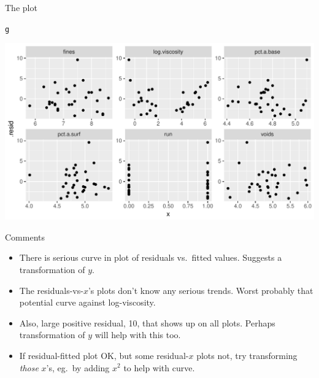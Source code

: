 \documentclass[unknownkeysallowed]{beamer}\usepackage[]{graphicx}\usepackage[]{color}
\makeatletter
\def\maxwidth{ %
  \ifdim\Gin@nat@width>\linewidth
    \linewidth
  \else
    \Gin@nat@width
  \fi
}
\newcommand{\hlstd}[1]{\textcolor[rgb]{0.345,0.345,0.345}{#1}}%
\newenvironment{kframe}{%
 \def\at@end@of@kframe{}%
 \ifinner\ifhmode%
  \def\at@end@of@kframe{\end{minipage}}%
  \begin{minipage}{\columnwidth}%
 \fi\fi%
 \def\FrameCommand##1{\hskip\@totalleftmargin \hskip-\fboxsep
 \colorbox{shadecolor}{##1}\hskip-\fboxsep
     \hskip-\linewidth \hskip-\@totalleftmargin \hskip\columnwidth}%
 \MakeFramed {\advance\hsize-\width
   \@totalleftmargin\z@ \linewidth\hsize
   \@setminipage}}%
 {\par\unskip\endMakeFramed%
 \at@end@of@kframe}
\newenvironment{knitrout}{}{} %
\makeatother
\begin{document}
\begin{frame}[fragile]{The plot}
  
\begin{knitrout}
\color{fgcolor}\begin{kframe}
\begin{alltt}
\hlstd{g}
\end{alltt}
\end{kframe}
\includegraphics[width=\maxwidth]{figure/unnamed-chunk-274-1} 

\end{knitrout}
  
\end{frame}


\begin{frame}[fragile]{Comments}
  
  \begin{itemize}
  \item There is serious curve in plot of residuals vs.\ fitted
    values. Suggests a transformation of $y$.
  \item The residuals-vs-$x$'s plots don't know any serious
    trends. Worst probably that potential curve against log-viscosity.
  \item Also, large positive residual, 10, that shows up on all
    plots. Perhaps transformation of $y$ will help with this too.
  \item If residual-fitted plot OK, but some residual-$x$ plots not,
    try transforming \emph{those} $x$'s, eg.\ by adding $x^2$ to help
    with curve.
  \end{itemize}
\end{frame}
\end{document}
